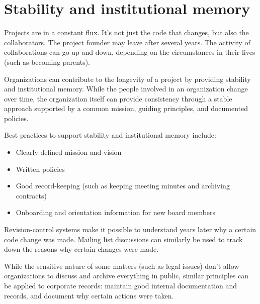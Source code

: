 


\chapter{Stability and institutional memory}

Projects are in a constant flux.  It's not just the code that changes, but also the collaborators.  The project founder may leave after several years.  The activity of collaborations can go up and down, depending on the circumstances in their lives (such as becoming parents).

Organizations can contribute to the longevity of a project by providing stability and institutional memory.  While the people involved in an organization change over time, the organization itself can provide consistency through a stable approach supported by a common mission, guiding principles, and documented policies.

Best practices to support stability and institutional memory include:

\begin{itemize}

\item Clearly defined mission and vision

\item Written policies

\item Good record-keeping (such as keeping meeting minutes and archiving contracts)

\item Onboarding and orientation information for new board members

\end{itemize}

Revision-control systems make it possible to understand years later why a certain code change was made.  Mailing list discussions can similarly be used to track down the reasons why certain changes were made.

While the sensitive nature of some matters (such as legal issues) don't allow organizations to discuss and archive everything in public, similar principles can be applied to corporate records: maintain good internal documentation and records, and document why certain actions were taken.

